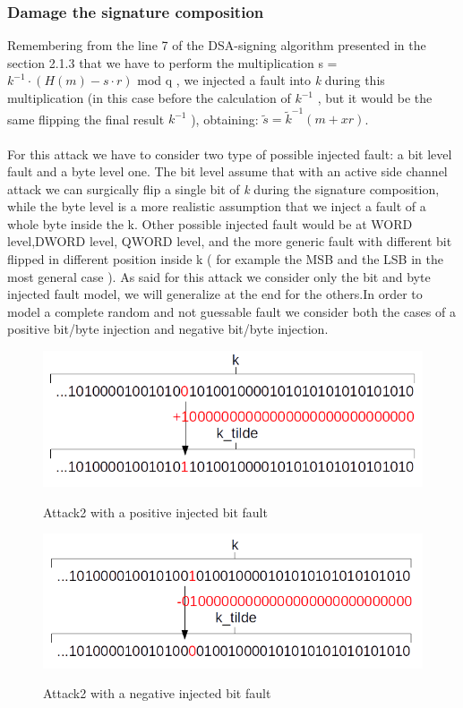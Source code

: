 \documentclass[11pt,english]{article}
\begin{document}
\subsubsection{Damage the signature composition}

Remembering from the line 7 of the DSA-signing algorithm presented in the section 2.1.3 that we have to perform the multiplication s  = $k^{-1} \cdot (H(m) - s \cdot r)$ mod q , we injected a fault into \textit{k} during this multiplication (in this case before the calculation of $k^{-1}$ , but it would be the same flipping the final result $k^{-1}$ ), obtaining: $\tilde{s} = \tilde{k}^{-1}(m + xr)$.
\\\\
For this attack we have to consider two type of possible injected fault: a bit level fault and a byte level one. The bit level assume that with an active side channel attack we can surgically flip a single bit of \textit{k} during the signature composition, while the byte level is a more realistic assumption that we inject a fault of a whole byte inside the k. Other possible injected fault would be at WORD level,DWORD level, QWORD level, and the more generic fault with different bit flipped in different position inside k ( for example the MSB and the LSB in the most general case ). As said for this attack we consider only the bit and byte injected fault model, we will generalize at the end for the others.In order to model a complete random and not guessable fault we consider both the cases of a positive bit/byte injection and negative bit/byte injection.

\begin{figure}[H]
\includegraphics[width=1.0\textwidth]{img/attack2bit.png} \\
\caption{\label{f_etichetta}Attack2 with a positive injected bit fault }
\end{figure}

\begin{figure}[H]
\includegraphics[width=1.0\textwidth]{img/attack2bitneg.png} \\
\caption{\label{f_etichetta}Attack2 with a negative injected bit fault }
\end{figure}
\end{document}
